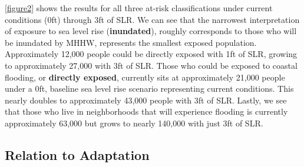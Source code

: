 \documentclass[12pt,]{article}
\begin{document}
\autoref{figure2} shows the results for all three at-risk
classifications under current conditions (0ft) through 3ft of SLR. We
can see that the narrowest interpretation of exposure to sea level rise
(\textbf{inundated}), roughly corresponds to those who will be inundated
by MHHW, represents the smallest exposed population. Approximately
12,000 people could be directly exposed with 1ft of SLR, growing to
approximately 27,000 with 3ft of SLR. Those who could be exposed to
coastal flooding, or \textbf{directly exposed}, currently sits at
approximately 21,000 people under a 0ft, baseline sea level rise
scenario representing current conditions. This nearly doubles to
approximately 43,000 people with 3ft of SLR. Lastly, we see that those
who live in neighborhoods that will experience flooding is currently
approximately 63,000 but grows to nearly 140,000 with just 3ft of SLR.

\hypertarget{relation-to-adaptation}{%
\subsection{Relation to Adaptation}\label{relation-to-adaptation}}
\newpage
\singlespacing 

\end{document}
